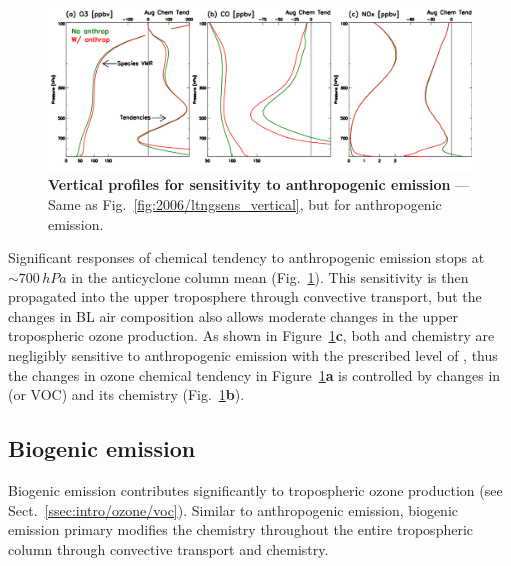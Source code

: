 	\begin{figure}[t!]
		\centering
		\includegraphics[width=1.0\textwidth]{sens/anthsens_vert}
		\caption[Vertical profiles for sensitivity to anthropogenic emission]{\textbf{Vertical profiles for sensitivity to
		anthropogenic emission} --- Same as Fig.~\ref{fig:2006/ltngsens_vertical}, but for anthropogenic emission.
		\label{fig:2006/anthsens_vert} }\vspace{-.3in}
	\end{figure}

Significant responses of chemical tendency to anthropogenic emission stops at $\sim700\,\unit{hPa}$ in the anticyclone
column mean (Fig.~\ref{fig:2006/anthsens_vert}). This sensitivity is then propagated into the upper troposphere through
convective transport, but the changes in BL air composition also allows moderate changes in the upper tropospheric
ozone production. As shown in Figure~\ref{fig:2006/anthsens_vert}{\bf c}, both  and  chemistry
are negligibly sensitive to anthropogenic emission with the prescribed level of {\lnox}, thus the changes in ozone chemical
tendency in Figure~\ref{fig:2006/anthsens_vert}{\bf a} is controlled by changes in  (or VOC) and its chemistry
(Fig.~\ref{fig:2006/anthsens_vert}{\bf b}).

\subsection{Biogenic emission}\label{ssec:2006/sens/bio}

Biogenic emission contributes significantly to tropospheric ozone production (see Sect.~\ref{ssec:intro/ozone/voc}).
Similar to anthropogenic emission, biogenic emission primary modifies the chemistry throughout the entire tropospheric
column through convective transport and chemistry.

